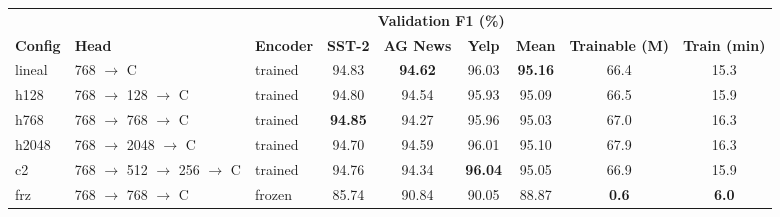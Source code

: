 \begin{tabular}{lllcccccc}
\toprule
\rowcolor{cabecera} &  &  & \multicolumn{4}{c}{\textbf{Validation F1 (\%)}} &  &  \\
\cmidrule(lr){4-7}
\rowcolor{cabecera}\textbf{Config} & \textbf{Head} & \textbf{Encoder} & \textbf{SST-2} & \textbf{AG News} & \textbf{Yelp} & \textbf{Mean} & \textbf{Trainable (M)} & \textbf{Train (min)} \\
\midrule
\rowcolor{lila}lineal & 768 $\to$ C & trained & 94.83 & \textbf{94.62} & 96.03 & \textbf{95.16} & 66.4 & 15.3 \\
h128 & 768 $\to$ 128 $\to$ C & trained & 94.80 & 94.54 & 95.93 & 95.09 & 66.5 & 15.9 \\
h768 & 768 $\to$ 768 $\to$ C & trained & \textbf{94.85} & 94.27 & 95.96 & 95.03 & 67.0 & 16.3 \\
h2048 & 768 $\to$ 2048 $\to$ C & trained & 94.70 & 94.59 & 96.01 & 95.10 & 67.9 & 16.3 \\
c2 & 768 $\to$ 512 $\to$ 256 $\to$ C & trained & 94.76 & 94.34 & \textbf{96.04} & 95.05 & 66.9 & 15.9 \\
\midrule
frz & 768 $\to$ 768 $\to$ C & frozen & 85.74 & 90.84 & 90.05 & 88.87 & \textbf{0.6} & \textbf{6.0} \\
\bottomrule
\end{tabular}

